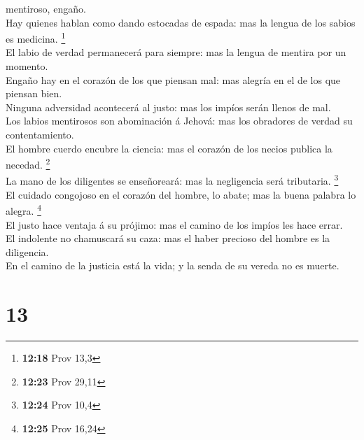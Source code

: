 mentiroso, engaño.\\
 Hay quienes hablan como dando estocadas de espada: mas la
lengua de los sabios es medicina. \footnote{\textbf{12:18} Prov 13,3}\\
 El labio de verdad permanecerá para siempre: mas la lengua
de mentira por un momento.\\
 Engaño hay en el corazón de los que piensan mal: mas
alegría en el de los que piensan bien.\\
 Ninguna adversidad acontecerá al justo: mas los impíos
serán llenos de mal.\\
 Los labios mentirosos son abominación á Jehová: mas los
obradores de verdad su contentamiento.\\
 El hombre cuerdo encubre la ciencia: mas el corazón de los
necios publica la necedad. \footnote{\textbf{12:23} Prov 29,11}\\
 La mano de los diligentes se enseñoreará: mas la
negligencia será tributaria. \footnote{\textbf{12:24} Prov 10,4}\\
 El cuidado congojoso en el corazón del hombre, lo abate;
mas la buena palabra lo alegra. \footnote{\textbf{12:25} Prov 16,24}\\
 El justo hace ventaja á su prójimo: mas el camino de los
impíos les hace errar.\\
 El indolente no chamuscará su caza: mas el haber precioso
del hombre es la diligencia.\\
 En el camino de la justicia está la vida; y la senda de su
vereda no es muerte.

\hypertarget{section-12}{%
\section{13}\label{section-12}}


